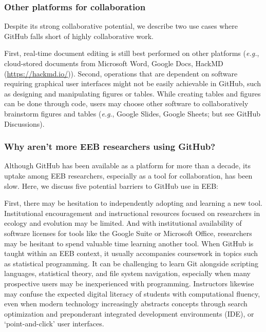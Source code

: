 \hypertarget{other-platforms-for-collaboration}{%
\subsubsection{Other platforms for collaboration}\label{other-platforms-for-collaboration}}

Despite its strong collaborative potential, we describe two use cases where GitHub falls short of highly collaborative work.

First, real-time document editing is still best performed on other platforms (\emph{e.g.}, cloud-stored documents from Microsoft Word, Google Docs, HackMD (\url{https://hackmd.io/})).
Second, operations that are dependent on software requiring graphical user interfaces might not be easily achievable in GitHub, such as designing and manipulating figures or tables.
While creating tables and figures can be done through code, users may choose other software to collaboratively brainstorm figures and tables (\emph{e.g}., Google Slides, Google Sheets; but see GitHub Discussions).

\hypertarget{why-arent-more-eeb-researchers-using-github}{%
\subsubsection{Why aren't more EEB researchers using GitHub?}\label{why-arent-more-eeb-researchers-using-github}}

Although GitHub has been available as a platform for more than a decade, its uptake among EEB researchers, especially as a tool for collaboration, has been slow. Here, we discuss five potential barriers to GitHub use in EEB:

First, there may be hesitation to independently adopting and learning a new tool.
Institutional encouragement and instructional resources focused on researchers in ecology and evolution may be limited.
And with institutional availability of software licenses for tools like the Google Suite or Microsoft Office, researchers may be hesitant to spend valuable time learning another tool.
When GitHub is taught within an EEB context, it usually accompanies coursework in topics such as statistical programming.
It can be challenging to learn Git alongside scripting languages, statistical theory, and file system navigation, especially when many prospective users may be inexperienced with programming.
Instructors likewise may confuse the expected digital literacy of students with computational fluency, even when modern technology increasingly abstracts concepts through search optimization and preponderant integrated development environments (IDE), or `point-and-click' user interfaces.

